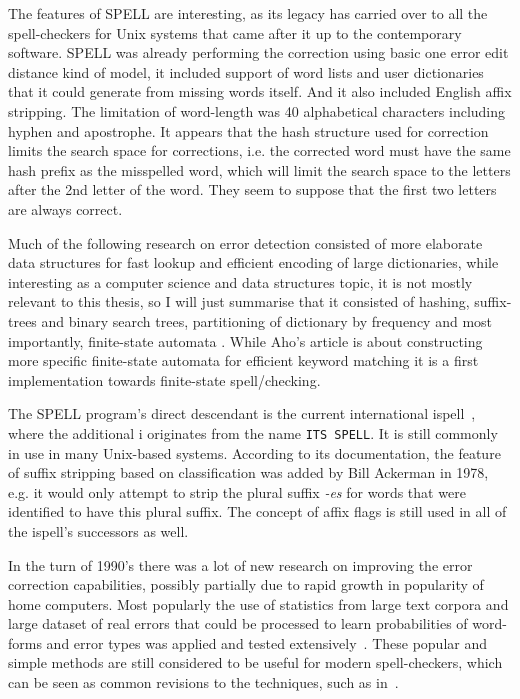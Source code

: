 \documentclass[officiallayout]{unihelcompling}
\begin{document}
The features of SPELL are interesting, as its legacy has carried over to all
the spell-checkers for Unix systems that came after it up to the contemporary
software.  SPELL was already performing the correction using basic one error
edit distance kind of model, it included support of word lists and user
dictionaries that it could generate from missing words itself. And it also
included English affix stripping. The limitation of word-length was 40
alphabetical characters including hyphen and apostrophe. It appears that the
hash structure used for correction limits the search space for corrections,
i.e. the corrected word must have the same hash prefix as the misspelled word,
which will limit the search space to the letters after the 2nd letter of the
word. They seem to suppose that the first two letters are always correct.
\citep{gorin1971spell}

Much of the following research on error detection consisted of more elaborate
data structures for fast lookup and efficient encoding of large dictionaries,
while interesting as a computer science and data structures topic, it is not
mostly relevant to this thesis, so I will just summarise that it consisted of
hashing, suffix-trees and binary search trees, partitioning of dictionary by
frequency \citep{knuth1973art} and most importantly, finite-state automata
\citep{aho1975efficient}. While Aho's article is about constructing more
specific finite-state automata for efficient keyword matching it is a first
implementation towards finite-state spell\-/checking.

The SPELL program's direct descendant is the current international
ispell~\citep{gorin1971spell}, where the additional i originates from the name
\texttt{ITS SPELL}. It is still commonly in use in many Unix-based systems.
According to its documentation, the feature of suffix stripping based on
classification was added by Bill Ackerman in 1978, e.g. it would only attempt
to strip the plural suffix \emph{-es} for words that were identified to have
this plural suffix.  The concept of affix flags is still used in all of the
ispell's successors as well.

In the turn of 1990's there was a lot of new research on improving the error
correction capabilities, possibly partially due to rapid growth in popularity
of home computers. Most popularly the use of statistics from large text corpora
and large dataset of real errors that could be processed to learn probabilities
of word-forms and error types was applied and tested
extensively~\citep{kernighan1990spelling,church1991probability}. These popular
and simple methods are still considered to be useful for modern spell-checkers,
which can be seen as common revisions to the techniques, such as
in~\citet{brill2000improved}.
\end{document}
